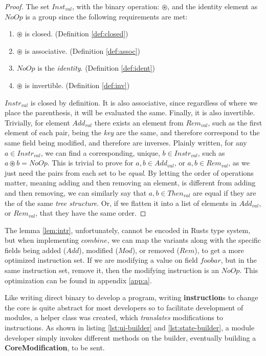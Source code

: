 \begin{proof}
  The set $Inst_{val}$, with the binary operation: $\circledast$, and the
  identity element as $NoOp$ is a group since
  the following requirements are met:
  \begin{enumerate}
    \item $\circledast$ is closed. (Definition \ref{def:closed})
    \item $\circledast$ is associative. (Definition \ref{def:assoc})
    \item $NoOp$ is the \textit{identity}. (Definition \ref{def:ident})
    \item $\circledast$ is invertible. (Definition \ref{def:inv})
  \end{enumerate}
  $Instr_{val}$ is closed by definition. It is also associative, since
  regardless of where we place  the parenthesis, it will be evaluated the same.
  Finally, it is also invertible. Trivially, for element $Add_{val}$ there
  exists an element from $Rem_{val}$, such as the first element of each pair,
  being the \textit{key} are the same, and therefore correspond to the same
  field being modified, and therefore are inverses. Plainly written, for any
  $a \in Instr_{val}$, we can find a corresponding, unique, $b \in Instr_{val}$,
  such as $a \circledast b = NoOp$. This is trivial to prove for
  $a, b \in Add_{val}$, or $a, b \in Rem_{val}$, as we just need the pairs from
  each set to be \textit{equal}. By letting the order of operations matter,
  meaning adding and then removing an element, is different from adding and then
  removing, we can similarly say that $a, b \in Then_{val}$ are equal if they
  are the of the same \textit{tree structure}. Or, if we flatten it into a
  list of elements in $Add_{val}$, or $Rem_{val}$, that they have the same
  order.
\end{proof}

The lemma \ref{lem:intr}, unfortunately, cannot be encoded in Rusts type
system, but when implementing $combine$, we can map the variants along with the
specific fields being added ($Add$), modified ($Mod$), or removed ($Rem$), to get
a more optimized instruction set. If we are modifying a value on field $foobar$,
but in the same instruction set, remove it, then the modifying instruction is an
$NoOp$. This optimization can be found in appendix \ref{app:a}.

Like writing direct binary to develop a program, writing \textbf{instruction}s to
change the core is quite abstract for most developers so to facilitate development
of modules, a helper class was created, which \textit{translates} modifications
to instructions. As shown in listing \ref{lst:ui-builder} and
\ref{lst:state-builder}, a module developer simply invokes different methods on
the builder, eventually building a \textbf{CoreModification}, to be sent.


